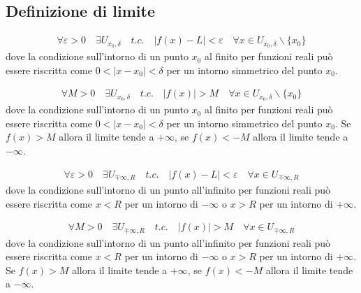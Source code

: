 \documentclass[letterpaper,10pt,italian]{jupyterBook}
\begin{document}
\subsection{Definizione di limite}
\label{\detokenize{ch/infinitesimal_calculus/analysis:definizione-di-limite}}\label{\detokenize{ch/infinitesimal_calculus/analysis:infinitesimal-calculus-limits-def}}


\sphinxAtStartPar
{}
\begin{equation*}
\begin{split}\forall \varepsilon > 0 \quad \exists U_{x_0,\delta} \quad {t.c.} \quad |f(x) - L| < \varepsilon \quad \forall x \in U_{x_0, \delta} \backslash \{x_0\}\end{split}
\end{equation*}
\sphinxAtStartPar
dove la condizione sull’intorno di un punto \(x_0\) al finito per funzioni reali può essere riscritta come \(0 < | x - x_0 | <  \delta\) per un intorno simmetrico del punto \(x_0\).

\sphinxAtStartPar
{}
\begin{equation*}
\begin{split}\forall M > 0 \quad \exists U_{x_0,\delta} \quad {t.c.} \quad |f(x)| > M \quad \forall x \in U_{x_0, \delta} \backslash \{x_0\}\end{split}
\end{equation*}
\sphinxAtStartPar
dove la condizione sull’intorno di un punto \(x_0\) al finito per funzioni reali può essere riscritta come \(0 < | x - x_0 | <  \delta\) per un intorno simmetrico del punto \(x_0\). Se \(f(x) > M\) allora il limite tende a \(+\infty\), se \(f(x) < -M\) allora il limite tende a \(-\infty\).

\sphinxAtStartPar
{}
\begin{equation*}
\begin{split}\forall \varepsilon > 0 \quad \exists U_{\mp\infty,R} \quad {t.c.} \quad |f(x) - L| < \varepsilon \quad \forall x \in U_{\mp\infty, R}\end{split}
\end{equation*}
\sphinxAtStartPar
dove la condizione sull’intorno di un punto all’infinito per funzioni reali può essere riscritta come \(x < R\) per un intorno di \(-\infty\) o \(x > R\) per un intorno di \(+\infty\).

\sphinxAtStartPar
{}
\begin{equation*}
\begin{split}\forall M > 0 \quad \exists U_{\mp \infty, R} \quad {t.c.} \quad |f(x)| > M \quad \forall x \in U_{\mp \infty, R}\end{split}
\end{equation*}
\sphinxAtStartPar
dove la condizione sull’intorno di un punto all’infinito per funzioni reali può essere riscritta come \(x < R\) per un intorno di \(-\infty\) o \(x > R\) per un intorno di \(+\infty\). Se \(f(x) > M\) allora il limite tende a \(+\infty\), se \(f(x) < -M\) allora il limite tende a \(-\infty\).
\end{document}
